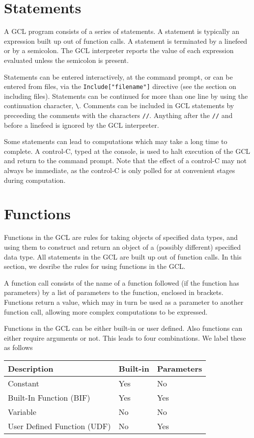 \section{Statements}

A GCL program consists of a series of statements.  A statement is
typically an expression built up out of function calls.  A statement
is terminated by a linefeed or by a semicolon.  The GCL interpreter
reports the value of each expression evaluated unless the semicolon is
present.  

Statements can be entered interactively, at the command prompt, or can
be entered from files, via the \verb+Include["filename"]+ directive
(see the section on including files).  Statements can be continued for
more than one line by using the continuation character, \verb+\+.
Comments can be included in GCL statements by preceeding the comments
with the characters \verb+//+.  Anything after the \verb+//+ and
before a linefeed is ignored by the GCL interpreter.

Some statements can lead to computations which may take a long time to
complete.  A control-C, typed at the console, is used to halt
execution of the GCL and return to the command prompt.  Note that the
effect of a control-C may not always be immediate, as the control-C is
only polled for at convenient stages during computation.

\section{Functions}

Functions in the GCL are rules for taking objects of specified data
types, and using them to construct and return an object of a (possibly
different) specified data type.  All statements in the GCL are built
up out of function calls.  In this section, we desribe the rules for
using functions in the GCL.

A function call consists of the name of a function followed (if the
function has parameters) by a list of parameters to the function,
enclosed in brackets.  Functions return a value, which may in turn
be used as a parameter to another function call, allowing more complex
computations to be expressed.

Functions in the GCL can be either built-in or user defined.  Also
functions can either require arguments or not.  This leads to four
combinations.  We label these as follows

\medskip
\begin{tabular} {l|ll} 
Description & Built-in & Parameters\\ 
\hline
Constant & Yes & No \\ 
Built-In Function (BIF) & Yes & Yes \\ 
Variable & No & No \\ 
User Defined Function (UDF) & No & Yes \\ 
\end{tabular}

